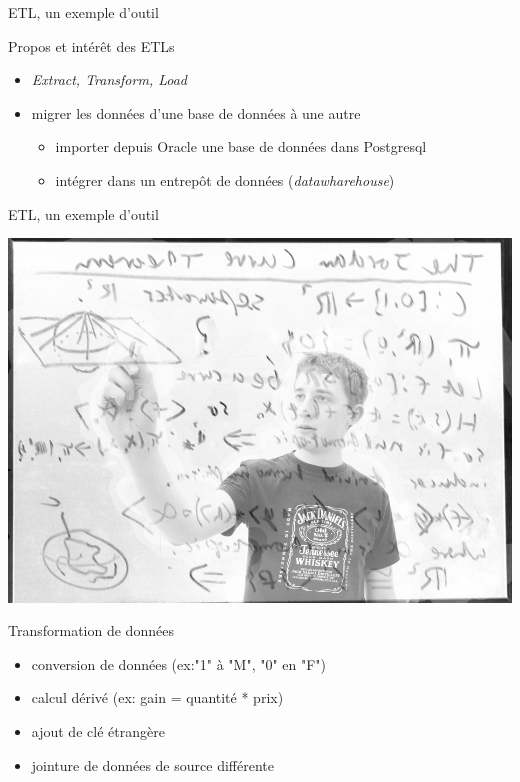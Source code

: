 {\begin{frame}{ETL, un exemple d'outil}
    \begin{block}{Propos et intérêt des ETLs}
      \begin{itemize}
        \item \textit{Extract, Transform, Load}
        \item migrer les données d'une base de données à une autre
        \begin{itemize}
          \item importer depuis Oracle une base de données dans Postgresql
          \item intégrer dans un entrepôt de données (\textit{datawharehouse})
        \end{itemize}
      \end{itemize}
    \end{block}
  \end{frame}

  \begin{frame}{ETL, un exemple d'outil}
    \begin{center}
      \includegraphics[scale=0.1]{../img/math.jpg}
    \end{center}
    \begin{block}{Transformation de données}
      \begin{itemize}
        \item conversion de données (ex:"1" à "M", "0" en "F")
        \item calcul dérivé (ex: gain = quantité * prix)
        \item ajout de clé étrangère
        \item jointure de données de source différente
      \end{itemize}
    \end{block}
  \end{frame}
}
